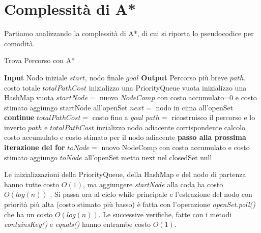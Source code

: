 \documentclass[12pt,a4paper]{report}
\begin{document}
\section{Complessità di A*}\label{se:comp-A-star}
Partiamo analizzando la complessità di A*, di cui si riporta lo pseudocodice per comodità.

\begin{algorithm}
\caption{Trova Percorso con A*}
\label{alg:A-Star-comp}
\begin{algorithmic}[1]
    \State \textbf{Input} Nodo iniziale $start$, nodo finale $goal$
    \State \textbf{Output} Percorso più breve $path$, costo totale $totalPathCost$
    \State inizializzo una PriorityQueue vuota
    \State inizializzo una HashMap vuota
    \State $startNode=$ nuovo $NodeComp$ con costo accumulato=0 e costo stimato
    \State aggiungo startNode all'openSet
        \State $next=$ nodo in cima all'openSet
            \State \textbf{continue}
        \EndIf
            \State $totalPathCost=$ costo fino a $goal$
            \State $path=$ ricostruisco il percorso e lo inverto
            \State \Return $path$ e $totalPathCost$
        \EndIf
            \State inzializzo nodo adiacente corrispondente
            \State calcolo costo accumulato e costo stimato per il nodo adiacente
                \State \textbf{passo alla prossima iterazione del for}
            \EndIf
            \State $toNode=$ nuovo NodeComp con costo accumulato e costo stimato
            \State aggiungo $toNode$ all'openSet
        \EndFor
        \State metto next nel closedSet
    \EndWhile
    \State \Return null
\end{algorithmic}
\end{algorithm}

\newpage
Le inizializzazioni della PriorityQueue, della HashMap e del nodo di partenza hanno tutte costo $O(1)$, ma aggiungere \textit{startNode} alla coda ha costo $O(log(n))$ \cite{oraclePriorityQueueJava}.
Si passa ora al ciclo while principale e l'estrazione del nodo con priorità più alta (costo stimato più basso) è fatta con l'operazione \textit{openSet.poll()} che ha un costo $O(log(n))$. Le successive verifiche, fatte con i metodi \textit{containsKey()} e \textit{equals()} hanno entrambe costo $O(1)$.
\end{document}
